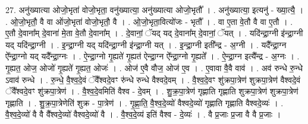 \documentclass[17pt]{extarticle}
\begin{document}
27. अनु॑ख्यात्या ओजो॒भृता॑ वोजो॒भृता॒ वनु॑ख्यात्या॒ अनु॑ख्यात्या ओजो॒भृतौ᳚ । . अनु॑ख्यात्या॒ इत्यनु॑ - ख्या॒त्यै॒ । . ओ॒जो॒भृतौ॒ वै वा ओ॑जो॒भृता॑ वोजो॒भृतौ॒ वै । . ओ॒जो॒भृता॒वित्यो॑जः - भृतौ᳚ । . वा ए॒ता वे॒तौ वै वा ए॒तौ । . ए॒तौ दे॒वाना᳚म् दे॒वाना॑ मे॒ता वे॒तौ दे॒वाना᳚म् । . दे॒वानां॒ ॅयद् यद् दे॒वाना᳚म् दे॒वानां॒ ॅयत् । . यदि॑न्द्रा॒ग्नी इ॑न्द्रा॒ग्नी यद् यदि॑न्द्रा॒ग्नी । . इ॒न्द्रा॒ग्नी यद् यदि॑न्द्रा॒ग्नी इ॑न्द्रा॒ग्नी यत् । . इ॒न्द्रा॒ग्नी इती᳚न्द्र - अ॒ग्नी । . यदै᳚न्द्रा॒ग्न ऐ᳚न्द्रा॒ग्नो यद् यदै᳚न्द्रा॒ग्नः । . ऐ॒न्द्रा॒ग्नो गृ॒ह्यते॑ गृ॒ह्यत॑ ऐन्द्रा॒ग्न ऐ᳚न्द्रा॒ग्नो गृ॒ह्यते᳚ । . ऐ॒न्द्रा॒ग्न इत्यै᳚न्द्र - अ॒ग्नः । . गृ॒ह्यत॒ ओज॒ ओजो॑ गृ॒ह्यते॑ गृ॒ह्यत॒ ओजः॑ । . ओज॑ ए॒वै वौज॒ ओज॑ ए॒व । . ए॒वावा वै॒वै वाव॑ । . अव॑ रुन्धे रु॒न्धे ऽवाव॑ रुन्धे । . रु॒न्धे॒ वै॒श्व॒दे॒वं ॅवै᳚श्वदे॒वꣳ रु॑न्धे रुन्धे वैश्वदे॒वम् । . वै॒श्व॒दे॒वꣳ शु॑क्रपा॒त्रेण॑ शुक्रपा॒त्रेण॑ वैश्वदे॒वं ॅवै᳚श्वदे॒वꣳ शु॑क्रपा॒त्रेण॑ । . वै॒श्व॒दे॒वमिति॑ वैश्व - दे॒वम् । . शु॒क्र॒पा॒त्रेण॑ गृह्णाति गृह्णाति शुक्रपा॒त्रेण॑ शुक्रपा॒त्रेण॑ गृह्णाति । . शु॒क्र॒पा॒त्रेणेति॑ शुक्र - पा॒त्रेण॑ । . गृ॒ह्णा॒ति॒ वै॒श्व॒दे॒व्यो॑ वैश्वदे॒व्यो॑ गृह्णाति गृह्णाति वैश्वदे॒व्यः॑ । . वै॒श्व॒दे॒व्यो॑ वै वै वै᳚श्वदे॒व्यो॑ वैश्वदे॒व्यो॑ वै । . वै॒श्व॒दे॒व्य॑ इति॑ वैश्व - दे॒व्यः॑ । . वै प्र॒जाः प्र॒जा वै वै प्र॒जाः । \newline
\end{document}
